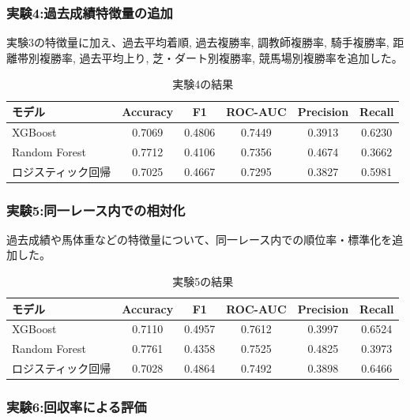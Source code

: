 \documentclass[dvipdfmx, a4paper, 11pt, titlepage]{jsarticle}
\begin{document}
\subsubsection{実験4:過去成績特徴量の追加}

実験3の特徴量に加え、過去平均着順, 過去複勝率, 調教師複勝率, 騎手複勝率,
距離帯別複勝率, 過去平均上り, 芝・ダート別複勝率, 競馬場別複勝率を追加した。

\begin{table}[H]
  \centering
  \caption{実験4の結果}
  \label{tab:exp4}
  \begin{tabular}{lccccc}
    \toprule
    モデル & Accuracy & F1 & ROC-AUC & Precision & Recall \\
    \midrule
    XGBoost           & 0.7069 & 0.4806 & 0.7449 & 0.3913 & 0.6230 \\
    Random Forest     & 0.7712 & 0.4106 & 0.7356 & 0.4674 & 0.3662 \\
    ロジスティック回帰 & 0.7025 & 0.4667 & 0.7295 & 0.3827 & 0.5981 \\
    \bottomrule
  \end{tabular}
\end{table}

\subsubsection{実験5:同一レース内での相対化}

過去成績や馬体重などの特徴量について、同一レース内での順位率・標準化を追加した。

\begin{table}[H]
  \centering
  \caption{実験5の結果}
  \label{tab:exp5}
  \begin{tabular}{lccccc}
    \toprule
    モデル & Accuracy & F1 & ROC-AUC & Precision & Recall \\
    \midrule
    XGBoost           & 0.7110 & 0.4957 & 0.7612 & 0.3997 & 0.6524 \\
    Random Forest     & 0.7761 & 0.4358 & 0.7525 & 0.4825 & 0.3973 \\
    ロジスティック回帰 & 0.7028 & 0.4864 & 0.7492 & 0.3898 & 0.6466 \\
    \bottomrule
  \end{tabular}
\end{table}

\subsubsection{実験6:回収率による評価}
\end{document}
